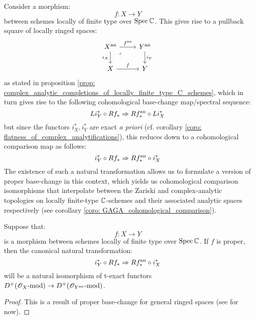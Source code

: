         \begin{remark}
            Consider a morphism:
                $$f: X \to Y$$
            between schemes locally of finite type over $\operatorname{Spec} \mathbb{C}$. This gives rise to a pullback square of locally ringed spaces:
                $$
                    \begin{tikzcd}
                    {X^{\an}} & {Y^{\an}} \\
                    X & Y
                    \arrow["{f^{\an}}", from=1-1, to=1-2]
                    \arrow["f", from=2-1, to=2-2]
                    \arrow["{i_X}"', from=1-1, to=2-1]
                    \arrow["{i_Y}", from=1-2, to=2-2]
                    \arrow["\lrcorner"{anchor=center, pos=0.125}, draw=none, from=1-1, to=2-2]
                    \end{tikzcd}
                $$
            as stated in proposition \ref{prop: complex_analytic_completions_of_locally_finite_type_C_schemes}, which in turn gives rise to the following cohomological base-change map/spectral sequence:
                $$Li_Y^* \circ R f_* \Rightarrow R f^{\mathrm{an}}_* \circ Li_X^*$$
            but since the functors $i_X^*, i_Y^*$ are exact \textit{a priori} (cf. corollary \ref{coro: flatness_of_complex_analytifications}), this reduces down to a cohomological comparison map as follows:
                $$i_Y^* \circ R f_* \Rightarrow R f^{\mathrm{an}}_* \circ i_X^*$$
            The existence of such a natural transformation allows us to formulate a version of proper base-change in this context, which yields us cohomological comparison isomorphisms that interpolate between the Zariski and complex-analytic topologies on locally finite-type $\mathbb{C}$-schemes and their associated analytic spaces respectively (see corollary \ref{coro: GAGA_cohomological_comparison}). 
        \end{remark}
        \begin{theorem} \label{theorem: relative_analytification_of_sheaves_of_modules}
            Suppose that:
                $$f: X \to Y$$
            is a morphism between schemes locally of finite type over $\operatorname{Spec} \mathbb{C}$. If $f$ is proper, then the canonical natural transformation:
                $$i_Y^* \circ R f_* \Rightarrow R f^{\mathrm{an}}_* \circ i_X^*$$
            will be a natural isomorphism of t-exact functors $D^+(\mathscr{O}_X\text{-}\mathrm{mod}) \to D^+(\mathscr{O}_{Y^{\mathrm{an}}}\text{-}\mathrm{mod})$.
        \end{theorem}
            \begin{proof}
                This is a result of proper base-change for general ringed spaces (see \cite[\href{https://stacks.math.columbia.edu/tag/09V4}{Tag 09V4}]{stacks-project} for now). 
            \end{proof}
